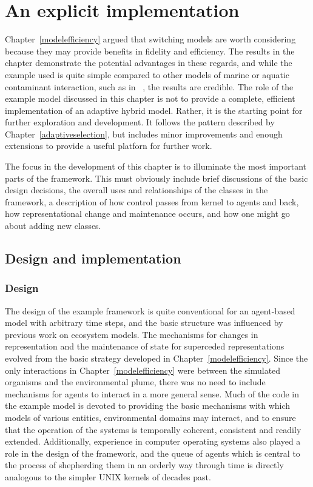 

\chapter[AN EXPLICIT IMPLEMENTATION]{An explicit implementation}
\WeAreOn{\cfive}\label{explicitmodel}

Chapter~\ref{modelefficiency} argued that switching models are worth
considering because they may provide benefits in fidelity and
efficiency. The results in the chapter demonstrate the potential
advantages in these regards, and while the example used is quite
simple compared to other models of marine or aquatic contaminant
interaction, such as in ~\cite{Gray2006nws, Gray2014}, the results are
credible.  The role of the example model discussed in this chapter is
not to provide a complete, efficient implementation of an adaptive
hybrid model.  Rather, it is the starting point for further
exploration and development.  It follows the pattern described by
Chapter~\ref{adaptiveselection}, but includes minor improvements and
enough extensions to provide a useful platforn for further work.

The focus in the development of this chapter is to illuminate the most
important parts of the framework. This must obviously include brief
discussions of the basic design decisions, the overall uses and
relationships of the classes in the framework, a description of how
control passes from kernel to agents and back, how representational
change and maintenance occurs, and how one might go about adding new
classes. 

\section{Design and implementation}
\subsection{Design}
The design of the example framework is quite conventional for an
agent-based model with arbitrary time steps, and the basic structure
was influenced by previous work on ecosystem models. The mechanisms
for changes in representation and the maintenance of state for
superceded representations evolved from the basic strategy developed
in Chapter~\ref{modelefficiency}.  Since the only interactions in
Chapter~\ref{modelefficiency} were between the simulated organisms and
the environmental plume, there was no need to include mechanisms for
agents to interact in a more general sense. Much of the code in the
example model is devoted to providing the basic mechanisms with which
models of various entities, environmental domains may interact, and to
ensure that the operation of the systems is temporally coherent,
consistent and readily extended. Additionally, experience in computer
operating systems also played a role in the design of the framework,
and the queue of agents which is central to the process of shepherding
them in an orderly way through time is directly analogous to the
simpler UNIX kernels of decades past.

